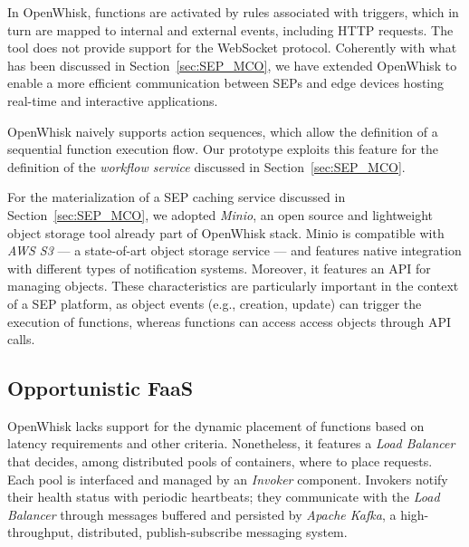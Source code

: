 
In OpenWhisk, functions are activated by rules associated with triggers, which in turn are mapped to internal and external events, including HTTP requests. The tool does not provide support for the WebSocket protocol. Coherently with what has been discussed in Section~\ref{sec:SEP_MCO}, we have extended OpenWhisk to enable a more efficient communication between SEPs and edge devices hosting real-time and interactive applications.  

OpenWhisk naively supports action sequences, which allow the definition of a sequential function execution flow. Our prototype exploits this feature for the definition of the \textit{workflow service} discussed in Section~\ref{sec:SEP_MCO}.

For the materialization of a SEP caching service discussed in Section~\ref{sec:SEP_MCO}, we adopted \textit{Minio}, an open source and lightweight object storage tool already part of OpenWhisk stack. Minio is compatible with \textit{AWS S3} --- a state-of-art object storage service --- and features native integration with different types of notification systems. Moreover, it features an API for managing objects. These characteristics are particularly important in the context of a SEP platform, as object events (e.g., creation, update) can trigger the execution of functions, whereas functions can access access objects through API calls. 




\subsection{Opportunistic FaaS}



OpenWhisk lacks support for the dynamic placement of functions based on latency requirements and other criteria. Nonetheless, it features a \textit{Load Balancer} that decides, among distributed pools of containers, where to place requests. Each pool is interfaced and managed by an \textit{Invoker} component. Invokers notify their health status with periodic heartbeats; they communicate with the \textit{Load Balancer} through messages buffered and persisted by \textit{Apache Kafka}, a high-throughput, distributed, publish-subscribe messaging system.

